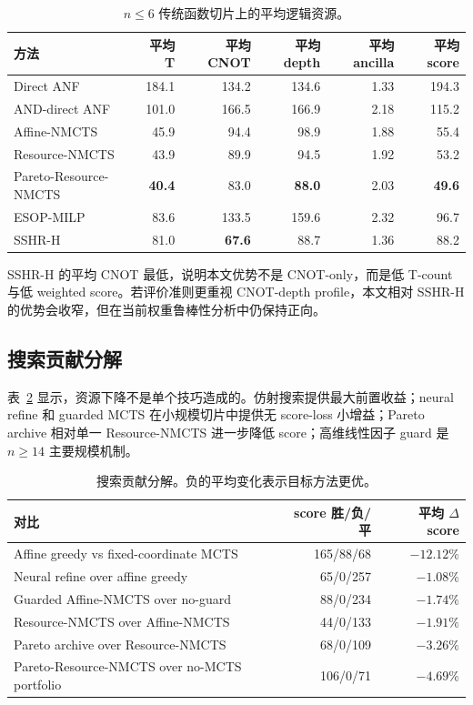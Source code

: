 \documentclass[UTF8,fontset=macnew,11pt]{ctexart}
\newcommand{\method}{Resource-NMCTS}
\newcommand{\pareto}{Pareto-Resource-NMCTS}
\begin{document}
\begin{table}[t]
\centering
\small
\caption{$n\leq6$ 传统函数切片上的平均逻辑资源。}
\label{tab:traditional}
\begin{tabular}{lrrrrr}
\toprule
方法 & 平均 T & 平均 CNOT & 平均 depth & 平均 ancilla & 平均 score \\
\midrule
Direct ANF & 184.1 & 134.2 & 134.6 & 1.33 & 194.3 \\
AND-direct ANF & 101.0 & 166.5 & 166.9 & 2.18 & 115.2 \\
Affine-NMCTS & 45.9 & 94.4 & 98.9 & 1.88 & 55.4 \\
\method{} & 43.9 & 89.9 & 94.5 & 1.92 & 53.2 \\
\pareto{} & \textbf{40.4} & 83.0 & \textbf{88.0} & 2.03 & \textbf{49.6} \\
ESOP-MILP & 83.6 & 133.5 & 159.6 & 2.32 & 96.7 \\
SSHR-H & 81.0 & \textbf{67.6} & 88.7 & 1.36 & 88.2 \\
\bottomrule
\end{tabular}
\end{table}

SSHR-H 的平均 CNOT 最低，说明本文优势不是 CNOT-only，而是低 T-count 与低 weighted score。若评价准则更重视 CNOT-depth profile，本文相对 SSHR-H 的优势会收窄，但在当前权重鲁棒性分析中仍保持正向。

\subsection{搜索贡献分解}

表~\ref{tab:search} 显示，资源下降不是单个技巧造成的。仿射搜索提供最大前置收益；neural refine 和 guarded MCTS 在小规模切片中提供无 score-loss 小增益；Pareto archive 相对单一 \method{} 进一步降低 score；高维线性因子 guard 是 $n\geq14$ 主要规模机制。

\begin{table}[t]
\centering
\small
\caption{搜索贡献分解。负的平均变化表示目标方法更优。}
\label{tab:search}
\begin{tabularx}{\linewidth}{>{\raggedright\arraybackslash}Xrr}
\toprule
对比 & score 胜/负/平 & 平均 $\Delta$ score \\
\midrule
Affine greedy vs fixed-coordinate MCTS & 165/88/68 & $-12.12\%$ \\
Neural refine over affine greedy & 65/0/257 & $-1.08\%$ \\
Guarded Affine-NMCTS over no-guard & 88/0/234 & $-1.74\%$ \\
\method{} over Affine-NMCTS & 44/0/133 & $-1.91\%$ \\
Pareto archive over \method{} & 68/0/109 & $-3.26\%$ \\
\pareto{} over no-MCTS portfolio & 106/0/71 & $-4.69\%$ \\
\bottomrule
\end{tabularx}
\end{table}
\end{document}
